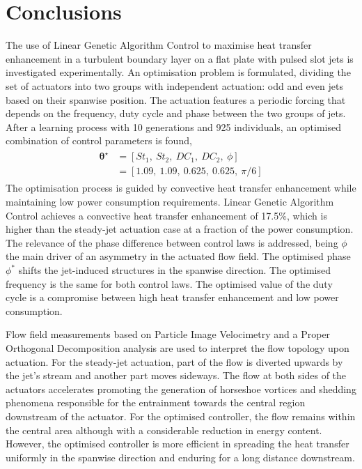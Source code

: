 \section{Conclusions \label{s:Conclusions}}

The use of Linear Genetic Algorithm Control to maximise heat transfer enhancement in a turbulent boundary layer on a flat plate with pulsed slot jets is investigated experimentally. %
An optimisation problem is formulated, dividing the set of actuators into two groups with independent actuation: odd and even jets based on their spanwise position. The actuation features a periodic forcing that depends on the frequency, duty cycle and phase between the two groups of jets. After a learning process with 10 generations and 925 individuals, an optimised combination of control parameters is found,
%
\begin{align*}
    \begin{split}
        \bm{\theta}^\star & = [St_1,~St_2,~DC_1,~DC_2,~\phi] \\
        & = [1.09,~1.09,~0.625,~0.625,~\pi/6]
    \end{split}
\end{align*}
%
The optimisation process is guided by convective heat transfer enhancement while maintaining low power consumption requirements. Linear Genetic Algorithm Control achieves a convective heat transfer enhancement of 17.5\%, which is higher than the steady-jet actuation case at a fraction of the power consumption. The relevance of the phase difference between control laws is addressed, being $\phi$ the main driver of an asymmetry in the actuated flow field. The optimised phase $\phi^*$ shifts the jet-induced structures in the spanwise direction. The optimised frequency is the same for both control laws. The optimised value of the duty cycle is a compromise between high heat transfer enhancement and low power consumption.

Flow field measurements based on Particle Image Velocimetry and a Proper Orthogonal Decomposition analysis are used to interpret the flow topology upon actuation. For the steady-jet actuation, part of the flow is diverted upwards by the jet's stream and another part moves sideways. The flow at both sides of the actuators accelerates promoting the generation of horseshoe vortices and shedding phenomena responsible for the entrainment towards the central region downstream of the actuator. For the optimised controller, the flow remains within the central area although with a considerable reduction in energy content. However, the optimised controller is more efficient in spreading the heat transfer uniformly in the spanwise direction and enduring for a long distance downstream. 

